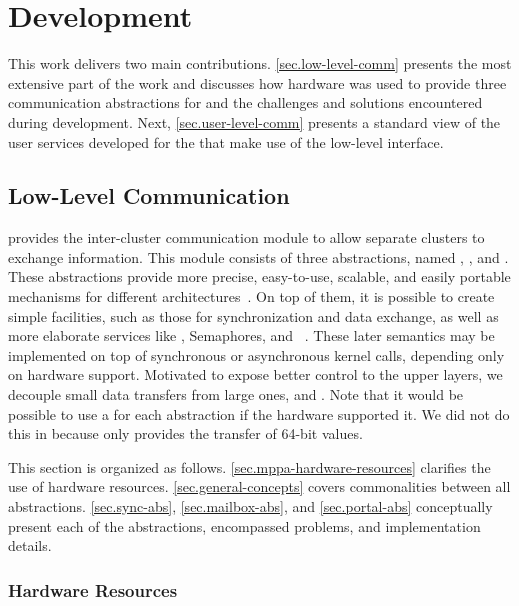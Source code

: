 \chapter{Development}
\label{ch.development}

	This work delivers two main contributions.
	\autoref{sec.low-level-comm} presents the most extensive part of the
	work and discusses how \mppa hardware was used to provide three communication abstractions for
	\textit{\nanvixhal} and the challenges and solutions encountered during development.
	Next, \autoref{sec.user-level-comm} presents a standard view of the user services
	developed for the \textit{\nanvixmicrokernel} that make use of the low-level interface.

	\section{Low-Level Communication}
	\label{sec.low-level-comm}

		\textit{\nanvixhal} provides the inter-cluster communication module to allow separate
		clusters to exchange information.
		This module consists of three abstractions, named \sync, \mailbox, and \portal.
		These abstractions provide more precise, easy-to-use, scalable, and easily
		portable mechanisms for different architectures~\cite{wentzlaff_fleets:_2011}.
		On top of them, it is possible to create simple
		facilities, such
		as those for synchronization and data exchange, as well as more elaborate services
		like \shm, \posix Semaphores, and \rmem~\cite{penna:rmen}.
		These later semantics may be implemented on top of synchronous
		or asynchronous kernel calls, depending only on hardware support.
		Motivated to expose better \qos control to the upper layers, we decouple small data
		transfers from large ones, \ie \mailbox and \portal.
		Note that it would be possible to use a \noc for each abstraction if the hardware supported it.
		We did not do this in \mppa because \cnoc only provides the transfer of 64-bit values.
		
		This section is organized as follows.
		\autoref{sec.mppa-hardware-resources} clarifies the use of \mppa hardware resources.
		\autoref{sec.general-concepts} covers commonalities between all abstractions.
		\autoref{sec.sync-abs},
		\autoref{sec.mailbox-abs}, and
		\autoref{sec.portal-abs}
		conceptually present each of the abstractions, encompassed problems, and 
		implementation details.

		\subsection{\mppa Hardware Resources}
		\label{sec.mppa-hardware-resources}

